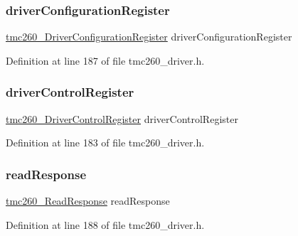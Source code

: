 \subsubsection{\texorpdfstring{driver\+Configuration\+Register}{driverConfigurationRegister}}
{\footnotesize\ttfamily \mbox{\hyperlink{tmc260__driver_8h_abfbbe7f0019af5812f509ef9866d375b}{tmc260\+\_\+\+Driver\+Configuration\+Register}} driver\+Configuration\+Register}



Definition at line 187 of file tmc260\+\_\+driver.\+h.

\mbox{\label{structtmc260___register_set___a9e19dca084d9d1634694f883273cd190}} 
\subsubsection{\texorpdfstring{driver\+Control\+Register}{driverControlRegister}}
{\footnotesize\ttfamily \mbox{\hyperlink{tmc260__driver_8h_a42b84b84bc4d9625475d9ec4ed84b568}{tmc260\+\_\+\+Driver\+Control\+Register}} driver\+Control\+Register}



Definition at line 183 of file tmc260\+\_\+driver.\+h.

\mbox{\label{structtmc260___register_set___af5aca622350ed83f1c856817fb63b3c7}} 
\subsubsection{\texorpdfstring{read\+Response}{readResponse}}
{\footnotesize\ttfamily \mbox{\hyperlink{tmc260__driver_8h_a09ad0d94646027ff63c22456ac9c2436}{tmc260\+\_\+\+Read\+Response}} read\+Response}



Definition at line 188 of file tmc260\+\_\+driver.\+h.

\mbox{\label{structtmc260___register_set___a00c49dc180ca3af071fe44406cde7d84}} 
